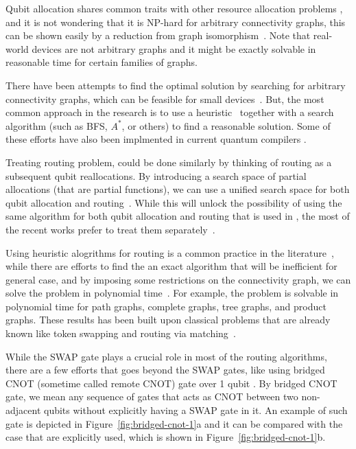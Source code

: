 Qubit allocation shares common traits with other resource allocation problems \cite{alicherry2012},\cite[pp. 440-444]{allen2001} and it is not wondering that it is NP-hard for arbitrary connectivity graphs, this can be shown easily by a reduction from graph isomorphism~\cite{siraichi2018}. Note that real-world devices are not arbitrary graphs and it might be exactly solvable in reasonable time for certain families of graphs. 

There have been attempts to find the optimal solution by searching for arbitrary connectivity graphs, which can be feasible for small devices~\cite{siraichi2018}. But, the most common approach in the research is to use a heuristic~\cite{zhang2021, itoko2019, cowtan2019,paler2019, murali2019} together with a search algorithm (such as BFS, $A^*$\cite{zulehner2018}, or others\cite{li2019}) to find a reasonable solution. Some of these efforts have also been implmented in current quantum compilers \cite{qiskit2023,sivarajah2021}.

Treating routing problem, could be done similarly by thinking of routing as a subsequent qubit reallocations. By introducing a search space of partial allocations (that are partial functions), we can use a unified search space for both qubit allocation and routing~\cite{zulehner2018,childs}. While this will unlock the possibility of using the same algorithm for both qubit allocation and routing that is used in \cite{zulehner2018}, the most of the recent works prefer to treat them separately~\cite{li2019,lao2021,childs}.

Using heuristic alogrithms for routing is a common practice in the literature~\cite{zulehner2018, itoko2019, cowtan2019, li2019}, while there are efforts to find the an exact algorithm \cite{itoko2019} that will be inefficient for general case, and by imposing some restrictions on the connectivity graph, we can solve the problem in polynomial time~\cite{childs}. For example, the problem is solvable in polynomial time for path graphs, complete graphs, tree graphs, and product graphs. These results has been built upon classical problems that are already known like token swapping and routing via matching~\cite{banerjee2017}.

While the SWAP gate plays a crucial role in most of the routing algorithms, there are a few efforts that goes beyond the SWAP gates, like using bridged CNOT (sometime called remote CNOT) gate over 1 qubit \cite{itoko2019,siraichi2018,sivarajah2021}. By bridged CNOT gate, we mean any sequence of gates that acts as CNOT between two non-adjacent qubits without explicitly having a SWAP gate in it. An example of such gate is depicted in Figure~\ref{fig:bridged-cnot-1}a and it can be compared with the case that  are explicitly used, which is shown in Figure~\ref{fig:bridged-cnot-1}b.

